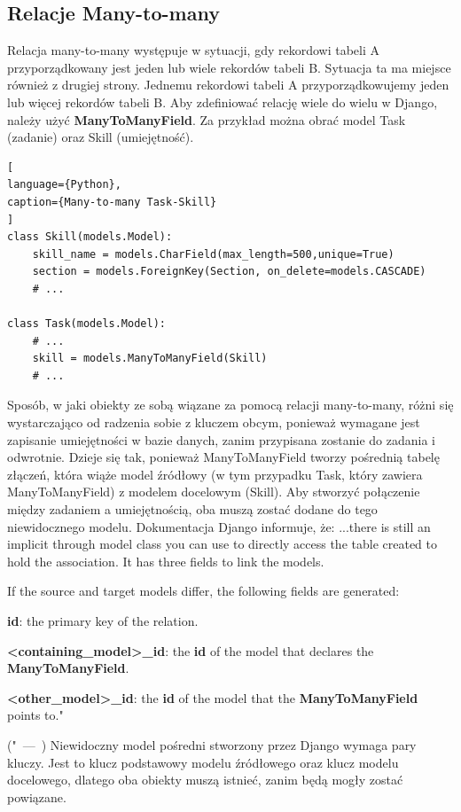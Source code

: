 \documentclass[oneside,polski,logo,indent]{amuthesis}
\let\oldquote\quote
\let\endoldquote\endquote
\renewenvironment{quote}[2][]
  {\if\relax\detokenize{#1}\relax
     \def\quoteauthor{#2}%
   \else
     \def\quoteauthor{#2~---~#1}%
   \fi
   \oldquote}
  {\par\nobreak\smallskip\hfill(\quoteauthor)%
   \endoldquote\addvspace{\bigskipamount}}
\begin{document}
\begin{enumerate}
\begin{enumerate}
\subsection{Relacje Many-to-many}
Relacja many-to-many występuje w sytuacji, gdy rekordowi tabeli A przyporządkowany jest jeden lub wiele rekordów tabeli B. Sytuacja ta ma miejsce również z drugiej strony. Jednemu rekordowi tabeli A przyporządkowujemy jeden lub więcej rekordów tabeli B.
Aby zdefiniować relację wiele do wielu w Django, należy użyć \textbf{ManyToManyField}. Za przykład można obrać model Task (zadanie) oraz Skill (umiejętność).
\begin{lstlisting}[
language={Python},
caption={Many-to-many Task-Skill}
]
class Skill(models.Model):
    skill_name = models.CharField(max_length=500,unique=True)
    section = models.ForeignKey(Section, on_delete=models.CASCADE)
	# ...

class Task(models.Model):
	# ...
    skill = models.ManyToManyField(Skill)
	# ...
\end{lstlisting}

Sposób, w jaki obiekty ze sobą wiązane za pomocą relacji many-to-many, różni się wystarczająco od radzenia sobie z kluczem obcym, ponieważ wymagane jest zapisanie umiejętności w bazie danych, zanim przypisana zostanie do zadania i odwrotnie. Dzieje się tak, ponieważ ManyToManyField tworzy pośrednią tabelę złączeń, która wiąże model źródłowy (w tym przypadku Task, który zawiera ManyToManyField) z modelem docelowym (Skill). Aby stworzyć połączenie między zadaniem a umiejętnością, oba muszą zostać dodane do tego niewidocznego modelu. Dokumentacja Django informuje, że:
\begin{quote}
"...there is still an implicit through model class you can use to directly access the table created to hold the association. It has three fields to link the models.

If the source and target models differ, the following fields are generated:

\textbf{id}: the primary key of the relation.

\textbf{<containing\_model>\_id}: the \textbf{id} of the model that declares the \textbf{ManyToManyField}.

\textbf{<other\_model>\_id}: the \textbf{id} of the model that the \textbf{ManyToManyField} points to."
\end{quote}
Niewidoczny model pośredni stworzony przez Django wymaga pary kluczy. Jest to klucz podstawowy modelu źródłowego oraz klucz modelu docelowego, dlatego oba obiekty muszą istnieć, zanim będą mogły zostać powiązane.


\end{enumerate}
\end{enumerate}
\end{document}
